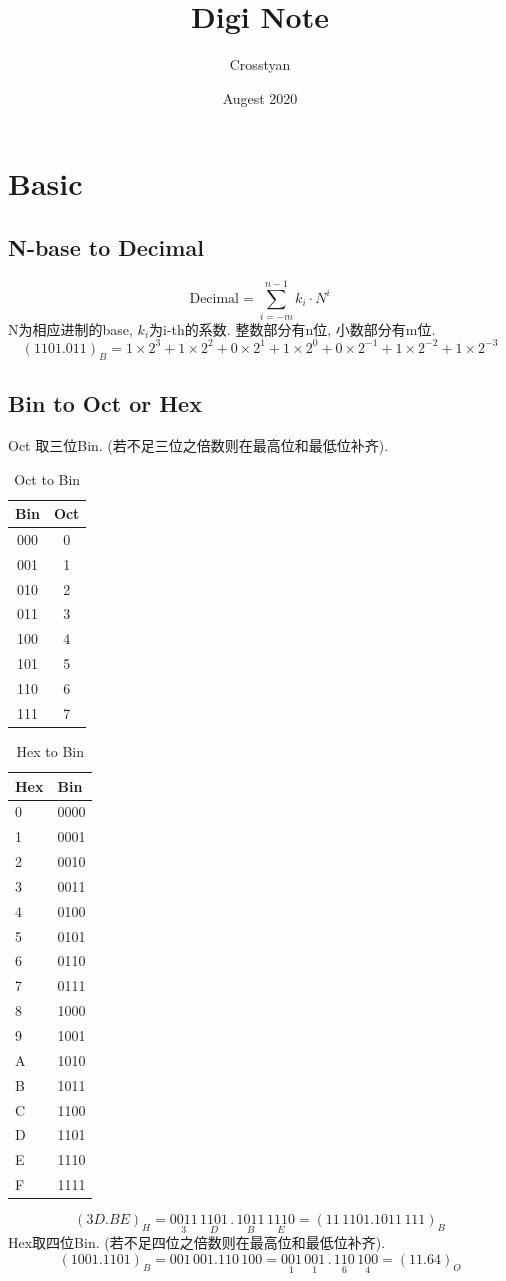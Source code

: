 \documentclass[scheme=chinese,a4paper]{report}
\title{Digi Note}
\author{Crosstyan}
\date{Augest 2020}
\begin{document}
  \chapter{Basic}
  \section{N-base to Decimal}
  $$\text{Decimal}=\sum_{i=-m}^{n-1} k_i\cdot N^i $$
  N为相应进制的base, $ k_i$为i-th的系数. 整数部分有n位, 小数部分有m位. 
  $$ (1101.011)_B=1\times 2^3+ 1\times 2^2+ 0\times 2^1+ 1\times 2^0+ 0\times 2^{-1}+ 1\times 2^{-2}+ 1\times 2^{-3} $$
  \section{Bin to Oct or Hex}
  Oct 取三位Bin. (若不足三位之倍数则在最高位和最低位补齐). 
  \begin{table}
    \centering
    \caption{Oct to Bin}
    \begin{tabular}{c c}
      \hline
      Bin&Oct\\
      \hline
      000&0 \\
      001&1 \\
      010&2 \\
      011&3 \\
      100&4 \\
      101&5 \\
      110&6 \\
      111&7 \\
    \end{tabular}
  \end{table}
  \begin{table}
    \centering
    \caption{Hex to Bin}
      \begin{tabular}{ll}
        \hline
        Hex&Bin\\
        \hline
      0     & 0000 \\
      1     & 0001 \\
      2     & 0010 \\
      3     & 0011 \\
      4     & 0100 \\
      5     & 0101 \\
      6     & 0110 \\
      7     & 0111 \\
      8     & 1000 \\
      9     & 1001 \\
      A     & 1010 \\
      B     & 1011 \\
      C     & 1100 \\
      D     & 1101 \\
      E     & 1110 \\
      F     & 1111 \\
      \end{tabular}%
  \end{table}%
  $$ (3D.BE)_{H}= \underset{3}{0011} \, \underset{D}{1101} \,.\, \underset{B}{1011}\, \underset{E}{1110}=(11\,1101.1011\,111)_B$$
  Hex取四位Bin. (若不足四位之倍数则在最高位和最低位补齐). 
  $$ (1001.1101)_B=001\,001.110\,100=\underset{1}{001}\,\underset{1}{001}\,.\,\underset{6}{110}\,\underset{4}{100}=(11.64)_O $$
\end{document}
